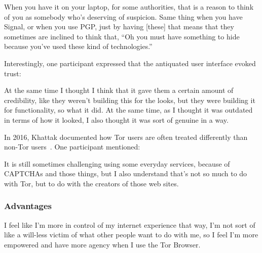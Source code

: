 \begin{displayquote}
When you have it on your laptop, for some authorities, that is a reason to think
of you as somebody who's deserving of suspicion.  Same thing when you have
Signal, or when you use PGP, just by having [these] that means that they
sometimes are inclined to think that, ``Oh you must have something to hide
because you've used these kind of technologies.''
\end{displayquote}

Interestingly, one participant expressed that the antiquated user interface
evoked trust:

\begin{displayquote}
At the same time I thought I think that it gave them a certain amount of
credibility, like they weren't building this for the looks, but they were
building it for functionality, so what it did.  At the same time, as I thought
it was outdated in terms of how it looked, I also thought it was sort of genuine
in a way.
\end{displayquote}

In 2016, Khattak \ea documented how Tor users are often treated differently than
non-Tor users~\cite{Khattak2016a}.  One participant mentioned:

\begin{displayquote}
It is still sometimes challenging using some everyday services, because of
CAPTCHAs and those things, but I also understand that's not so much to do with
Tor, but to do with the creators of those web sites.
\end{displayquote}

\subsubsection{Advantages}

\begin{displayquote}
I feel like I'm more in control of my internet experience that way, I'm not sort
of like a will-less victim of what other people want to do with me, so I feel
I'm more empowered and have more agency when I use the Tor Browser.
\end{displayquote}
